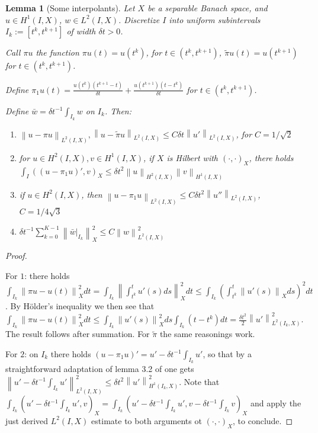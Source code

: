 \documentclass[english,a4paper,10pt,oneside]{scrbook}	%
\theoremstyle{break}
\newtheorem{lemma}[equation]{Lemma}
\newenvironment{mproof}[1][\proofname]{%
  \begin{proof}[#1]$ $\par\nobreak\ignorespaces
}{%
  \end{proof}
}
\renewcommand*{\proofname}{Proof}
\theoremstyle{remark}
\newcommand{\ds}{\displaystyle}
\newcommand{\norm}[1]{\left\lVert#1\right\rVert}
\begin{document}
\begin{appendices}
\begin{lemma}[Some interpolants]
\label{lemma:pw_constant_appr}
Let $X$ be a separable Banach space, and $u \in H^1(I,X)$, $w \in L^2(I,X)$. Discretize $I$ into uniform subintervals $I_k:=[t^k,t^{k+1}]$ of width $\delta t>0$.

Call $\pi u $ the function $\pi u(t)=u(t^{k})$, for $t \in (t^k,t^{k+1})$, $\tilde{\pi}u(t) = u(t^{k+1})$ for $t \in (t^k,t^{k+1})$.

Define $\ds \pi_1 u(t) = \frac{u(t^k)(t^{k+1}-t)}{\delta t} + \frac{u(t^{k+1})(t-t^k)}{\delta t}$ for $t \in (t^k,t^{k+1})$.

Define $\ds \bar{w} = \delta t^{-1}\int_{I_k}w$ on $I_k$. Then:

\begin{enumerate}
	\item $\norm{u-\pi u}_{L^2(I,X)}, \norm{u-\tilde{\pi }u}_{L^2(I,X)}\leq C \delta t \norm{u'}_{L^2(I,X)}$, for $C=1/\sqrt{2}$
	\item for $u \in H^2(I,X), v \in H^1(I,X)$, if $X$ is Hilbert with $(\cdot, \cdot)_X$, there holds $\ds \int_I ((u-\pi_1 u)',v)_X \leq \delta t^2 \norm{u}_{H^2(I,X)}\norm{v}_{H^1(I,X)} $
	\item if $u \in H^2(I,X)$, then $\norm{u-\pi_1 u}_{L^2(I,X)}\leq C\delta t^2\norm{u''}_{L^2(I,X)}$, $C = 1/4\sqrt{3}$
	\item $\ds \delta t^{-1} \sum_{k=0}^{K-1}\norm{\bar{w}|_{I_k}}_X^2\leq C \norm{w}_{L^2(I,X)}^2$
\end{enumerate}

\end{lemma}

\begin{mproof}
For $1$: there holds $\ds \int_{I_k}\norm{\pi u - u(t)}_X^2 dt = \int_{I_k} \norm{\int_{t^k}^{t} u'(s)ds}_X^2 dt\leq \int_{I_k}\left ( \int_{t^k}^{t} \norm{u'(s)}_X ds \right )^2 dt$. 
By Hölder's inequality we then see that $ \ds \int_{I_k}\norm{\pi u - u(t)}_X^2 dt \leq  \int_{I_k} \norm{u'(s)}_X^2 ds  \int_{I_k}(t-t^k)dt = \frac{\delta t ^2}{2} \norm{u'}_{L^2(I_k,X)}^2$. The result follows after summation. For $\tilde{\pi}$ the same reasonings work.

For $2$: on $I_k$ there holds $(u-\pi_1 u)' = u'-\delta t^{-1}\ds \int_{I_k} u'$, so that by a straightforward adaptation of lemma 3.2 of \cite{lshou} one gets $\norm{u'-\delta t^{-1}\ds \int_{I_k} u'}_{L^2(I,X)}^2\leq \delta t^2 \norm{u'}_{H^1(I_k,X)}^2$. Note that $\ds \int_{I_k} \left ( u' - \delta t^{-1} \int_{I_k}u', v\right )_X = \int_{I_k} \left ( u' - \delta t^{-1} \int_{I_k}u', v - \delta t^{-1} \int_{I_k}v\right )_X$ and apply the just derived $L^2(I,X)$ estimate to both arguments ot $(\cdot,\cdot)_X$, to conclude.


\end{mproof}
\end{appendices}
\end{document}
